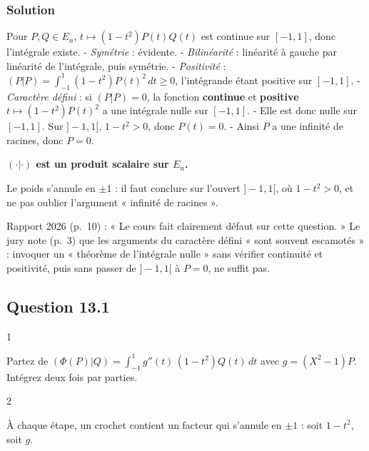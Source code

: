 \documentclass[11pt,a4paper]{article}
\begin{document}
\hypertarget{solution-32}{%
\subsubsection{Solution}\label{solution-32}}

Pour \(P,Q\in E_n\), \(t\mapsto(1-t^2)P(t)Q(t)\) est continue sur \([-1,1]\), donc l'intégrale existe.
- \emph{Symétrie} : évidente.
- \emph{Bilinéarité} : linéarité à gauche par linéarité de l'intégrale, puis symétrie.
- \emph{Positivité} : \((P|P)=\int_{-1}^1(1-t^2)P(t)^2\,dt\ge0\), l'intégrande étant positive sur \([-1,1]\).
- \emph{Caractère défini} : si \((P|P)=0\), la fonction \textbf{continue} et \textbf{positive} \(t\mapsto(1-t^2)P(t)^2\) a une intégrale nulle sur \([-1,1]\).
- Elle est donc nulle sur \([-1,1]\). Sur \(]-1,1[\), \(1-t^2>0\), donc \(P(t)=0\).
- Ainsi \(P\) a une infinité de racines, donc \(P=0\).

\textbf{\((\cdot|\cdot)\) est un produit scalaire sur \(E_n\).}

\begin{piege}

Le poids s'annule en \(\pm1\) : il faut conclure sur l'ouvert \(]-1,1[\), où \(1-t^2>0\), et ne pas oublier l'argument « infinité de racines ».

\end{piege}

\begin{jury}

Rapport 2026 (p.~10) : « Le cours fait clairement défaut sur cette question. » Le jury note (p.~3) que les arguments du caractère défini « sont souvent escamotés » : invoquer un « théorème de l'intégrale nulle » sans vérifier continuité et positivité, puis sans passer de \(]-1,1[\) à \(P=0\), ne suffit pas.

\end{jury}

\hypertarget{question-13.1}{%
\subsection{Question 13.1}\label{question-13.1}}

\begin{indication}{1}

Partez de \((\Phi(P)|Q)=\int_{-1}^1 g''(t)\,(1-t^2)Q(t)\,dt\) avec \(g=(X^2-1)P\). Intégrez deux fois par parties.

\end{indication}

\begin{indication}{2}

À chaque étape, un crochet contient un facteur qui s'annule en \(\pm1\) : soit \(1-t^2\), soit \(g\).

\end{indication}
\end{document}
